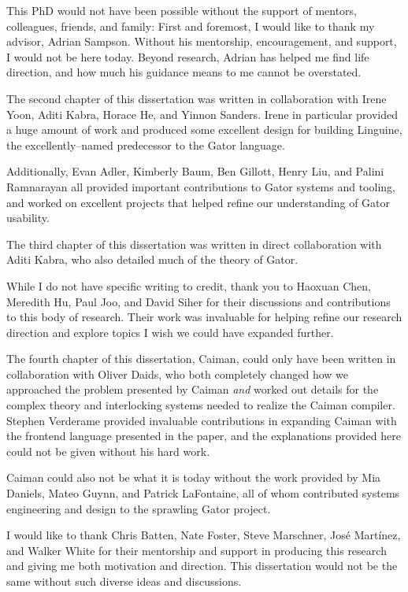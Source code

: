 \documentclass[phd,tocprelim]{cornell}
\begin{document}
\begin{acknowledgements}
This PhD would not have been possible without the support of mentors, colleagues, friends, and family:
First and foremost, I would like to thank my advisor, Adrian Sampson.  Without his mentorship, encouragement, and support, I would not be here today.  Beyond research, Adrian has helped me find life direction, and how much his guidance means to me cannot be overstated.

The second chapter of this dissertation was written in collaboration with Irene Yoon, Aditi Kabra, Horace He, and Yinnon Sanders.  Irene in particular provided a huge amount of work and produced some excellent design for building Linguine, the excellently--named predecessor to the Gator language.  

Additionally, Evan Adler, Kimberly Baum, Ben Gillott, Henry Liu, and Palini Ramnarayan all provided important contributions to Gator systems and tooling, and worked on excellent projects that helped refine our understanding of Gator usability.

The third chapter of this dissertation was written in direct collaboration with Aditi Kabra, who also detailed much of the theory of Gator.

While I do not have specific writing to credit, thank you to Haoxuan Chen, Meredith Hu, Paul Joo, and David Siher for their discussions and contributions to this body of research.  Their work was invaluable for helping refine our research direction and explore topics I wish we could have expanded further.

The fourth chapter of this dissertation, Caiman, could only have been written in collaboration with Oliver Daids, who both completely changed how we approached the problem presented by Caiman \textit{and} worked out details for the complex theory and interlocking systems needed to realize the Caiman compiler.  Stephen Verderame provided invaluable contributions in expanding Caiman with the frontend language presented in the paper, and the explanations provided here could not be given without his hard work.

Caiman could also not be what it is today without the work provided by Mia Daniels, Mateo Guynn, and Patrick LaFontaine, all of whom contributed systems engineering and design to the sprawling Gator project.

I would like to thank Chris Batten, Nate Foster, Steve Marschner, Jos\'e Mart\'inez, and Walker White for their mentorship and support in producing this research and giving me both motivation and direction.  This dissertation would not be the same without such diverse ideas and discussions.


\end{acknowledgements}
\end{document}
